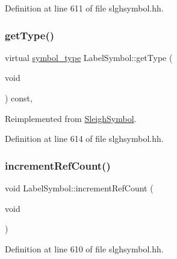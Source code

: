 Definition at line 611 of file slghsymbol.\+hh.

\mbox{\label{class_label_symbol_ab26e2c5bd5b9c241f7a08d725bd367f7}} 
\subsubsection{\texorpdfstring{getType()}{getType()}}
{\footnotesize\ttfamily virtual \mbox{\hyperlink{class_sleigh_symbol_aba70f7f332fd63488c5ec4bd7807db41}{symbol\+\_\+type}} Label\+Symbol\+::get\+Type (\begin{DoxyParamCaption}\item[{void}]{ }\end{DoxyParamCaption}) const\hspace{0.3cm}{\ttfamily [inline]}, {\ttfamily [virtual]}}



Reimplemented from \mbox{\hyperlink{class_sleigh_symbol_a2f6e5903e461084c29f95ea024883950}{Sleigh\+Symbol}}.



Definition at line 614 of file slghsymbol.\+hh.

\mbox{\label{class_label_symbol_a2183bca5aed7e7dffc74a0e3538e5093}} 
\subsubsection{\texorpdfstring{incrementRefCount()}{incrementRefCount()}}
{\footnotesize\ttfamily void Label\+Symbol\+::increment\+Ref\+Count (\begin{DoxyParamCaption}\item[{void}]{ }\end{DoxyParamCaption})\hspace{0.3cm}{\ttfamily [inline]}}



Definition at line 610 of file slghsymbol.\+hh.

\mbox{\label{class_label_symbol_a064baae89f74e0b4b3bafa3681fefedc}} 
